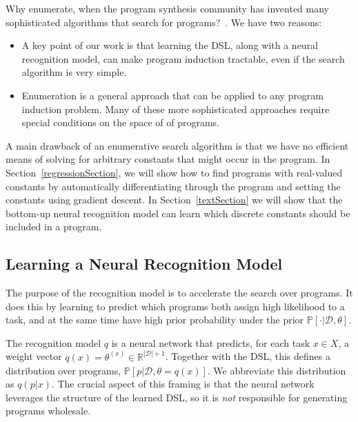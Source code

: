 \documentclass{article}
\newcommand{\probability}{\mathds{P}} %
\begin{document}
Why enumerate, when the program synthesis community has invented many
sophisticated algorithms that search for programs?~\cite{solar2008program,schkufza2013stochastic,feser2015synthesizing,osera2015type,polozov2015flashmeta}.
We have two reasons:%
\begin{itemize}
\item A key point of our work is that learning the DSL, along with a neural recognition model, can make program induction tractable, even if the search algorithm is very simple.
\item Enumeration is a general approach that can be applied to any program induction problem. Many of these more sophisticated approaches require special conditions on
  the space of of programs.
\end{itemize}
A main drawback of an enumerative search algorithm is that we have no
efficient means of solving for arbitrary constants that might occur in the
program. In Section~\ref{regressionSection},
we will show how to find programs with real-valued constants
by automatically differentiating through the program and setting the constants using gradient descent.
In Section~\ref{textSection}
we will show that the bottom-up neural recognition model can learn
which discrete constants should be included in a program.







\subsection{Learning a Neural Recognition Model}\label{recognitionSection}

The purpose of the recognition model is to accelerate the search over
programs.  It does this by learning to predict which programs both 
assign high likelihood to a task, and at the same time 
have high prior probability under the prior $\probability[\cdot |\mathcal{D},\theta]$.

The recognition model $q$ is a neural network that predicts,
for each task $x\in X$, a weight vector $q(x) = \theta^{(x)}\in \mathbb{R}^{|\mathcal{D}| + 1}$.
Together with the DSL, this defines a distribution over programs,
$\probability[p|\mathcal{D},\theta = q(x)]$.
We abbreviate this distribution as $q(p|x)$.
The crucial aspect of this framing is that the neural network
leverages the structure of the learned DSL,
so it is \emph{not} responsible for
generating programs wholesale.
\end{document}
